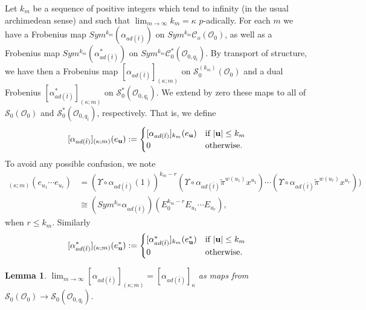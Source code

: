 \documentclass{article}
\newtheorem{lemma}[theorem]{Lemma}
\theoremstyle{remark}
\def\c #1{ {\mathcal #1} }
\def\b #1{ {\bf #1} }
\begin{document}
Let $k_m$ be a sequence of positive integers which tend to infinity (in the usual archimedean sense) and such that $\lim_{m \rightarrow \infty} k_m = \kappa$ $p$-adically. For each $m$ we have a Frobenius map $Sym^{k_m} (\alpha_{a d(\bar t)})$ on $Sym^{k_m} \c C_o(\c O_0)$, as well as a Frobenius map $Sym^{k_m}( \alpha^*_{a d(\bar t)})$ on $Sym^{k_m} \c C_0^*(\c O_{0, q_{\bar t}})$. By transport of structure, we have then a Frobenius map $[ \alpha_{a d(\bar t)} ]_{(\kappa; m)}$ on $\c S_0^{(k_m)}(\c O_0)$ and a dual  Frobenius $[\alpha_{a d(\bar t)}^* ]_{(\kappa; m)}$ on $\c S_0^*(\c O_{0, q_{\bar t}})$. We extend by zero these maps to all of $\c S_0(\c O_0)$ and $\c S_0^*(\c O_{0, q_{\bar t}})$, respectively. That is, we define 
\[
[ \alpha_{a d(\bar t)} ]_{(\kappa; m)}( e_{\b u}) := 
\begin{cases}
[ \alpha_{a d(\bar t)} ]_{k_m}( e_{\b u} ) & \text{if $|\b u| \leq k_m$} \\
0 & \text{otherwise.}
\end{cases} 
\]
To avoid any possible confusion, we note
\begin{align*}
[\alpha_{a d(\bar t)}]_{(\kappa; m)}( e_{u_1} \cdots e_{u_r}) &=  (\Upsilon \circ \alpha_{a d(\bar t)}(1))^{k_m - r} ( \Upsilon \circ \alpha_{a d(\bar t)}\tilde \pi^{w(u_1)} x^{u_1} ) \cdots ( \Upsilon \circ \alpha_{a d(\bar t)} \tilde \pi^{w(u_r)} x^{u_r}) ) \\
&\cong \left( Sym^{k_m} \alpha_{a d(\bar t)}  \right)( E_0^{k_m - r} E_{u_1} \cdots E_{u_r}),
\end{align*}
when $r \leq k_m$. Similarly
\[
[ \alpha_{a d(\bar t)}^* ]_{(\kappa; m)}( e_{\b u}^*) := 
\begin{cases}
[ \alpha_{a d(\bar t)}^* ]_{k_m}( e_{\b u}^* ) & \text{if $|\b u| \leq k_m$} \\
0 & \text{otherwise.}
\end{cases} 
\]


\begin{lemma}
$\lim_{m \rightarrow \infty} [ \alpha_{a d(\bar t)} ]_{(\kappa; m)} = [\alpha_{a d(\bar t)}]_\kappa$ as maps from $\c S_0(\c O_0) \rightarrow \c S_0(\c O_{0, q_{\bar t}})$.
\end{lemma}
\end{document}
